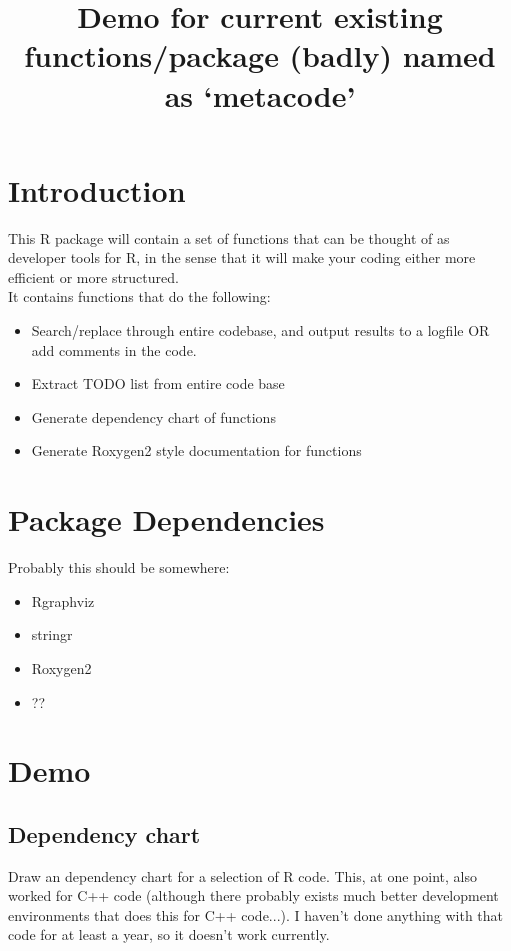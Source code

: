 \documentclass[11pt]{article}
\begin{document}
\title{Demo for current existing functions/package (badly) named as `metacode'}

\maketitle

\tableofcontents
\pagebreak


\section{Introduction}
This R package will contain a set of functions that can be thought of as developer tools for R, in the sense that it will make your coding either more efficient or more structured. \\

It contains functions that do the following: 
\begin{itemize}
\item Search/replace through entire codebase, and output results to a logfile OR add comments in the code. 
\item Extract TODO list from entire code base
\item Generate dependency chart of functions
\item Generate Roxygen2 style documentation for functions
\end{itemize}

\section{Package Dependencies}
Probably this should be somewhere: 
\begin{itemize}
\item Rgraphviz
\item stringr
\item Roxygen2
\item ??
\end{itemize}

\section{Demo}
\subsection{Dependency chart}
Draw an dependency chart for a selection of R code. This, at one point, also worked for C++ code (although there probably exists much better development environments that does this for C++ code...). I haven't done anything with that code for at least a year, so it doesn't work currently. 
\end{document}
